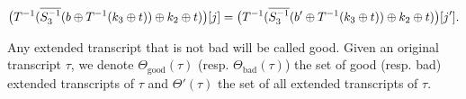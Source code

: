 \begin{definition}
\begin{itemize}[leftmargin=10mm]
{		%
		$$\big(T^{-1}(\overline{S_3^{-1}}(b \oplus T^{-1}(k_3\oplus t))\oplus k_2\oplus t)\big)[j]=\big(T^{-1}(\overline{S_3^{-1}}(b' \oplus T^{-1}(k_3\oplus t))\oplus k_2\oplus t)\big)[j'].
		$$
	}%
	\end{itemize}
	Any extended transcript that is not bad will be called good. Given an original transcript $\tau$, we denote $\Theta_{\mathrm{good}}(\tau)$ (resp. $\Theta_{\mathrm{bad}}(\tau)$) the set of good (resp. bad) extended transcripts of $\tau$ and $\Theta'(\tau)$ the set of all extended transcripts of $\tau$.
\end{definition}



%
%
%	


